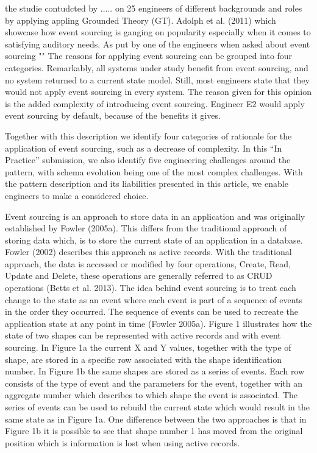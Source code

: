 the studie contudcted by ..... on 25 engineers of different backgrounds and roles by applying appling Grounded Theory (GT). Adolph et al. (2011) which showcase how event sourcing is ganging on popularity especially when it comes to satisfying auditory needs. As put by one of the engineers when asked about event sourcing ""
The reasons for applying event sourcing can be grouped into four categories. Remarkably, all systems under study benefit from event sourcing, and no system returned to a current state model. Still, most engineers state that they would not apply event sourcing in every system. The reason given for this opinion is the added complexity of introducing event sourcing. Engineer E2 would apply event sourcing by default, because of the benefits it gives.~\citep{OVEREEM2021110970}


Together with this description we identify four categories of rationale for the application of event sourcing, such as a decrease of complexity. In this “In Practice” submission, we also identify five engineering challenges around the pattern, with schema evolution being one of the most complex challenges. With the pattern description and its liabilities presented in this article, we enable engineers to make a considered choice.


Event sourcing is an approach to store data in an application and was originally established by
Fowler (2005a). This differs from the traditional approach of storing data which, is to store the
current state of an application in a database. Fowler (2002) describes this approach as active
records. With the traditional approach, the data is accessed or modified by four operations,
Create, Read, Update and Delete, these operations are generally referred to as CRUD operations
(Betts et al. 2013). The idea behind event sourcing is to treat each change to the state as an
event where each event is part of a sequence of events in the order they occurred. The sequence
of events can be used to recreate the application state at any point in time (Fowler 2005a).
Figure 1 illustrates how the state of two shapes can be represented with active records and with
event sourcing. In Figure 1a the current X and Y values, together with the type of shape, are
stored in a specific row associated with the shape identification number. In Figure 1b the same
shapes are stored as a series of events. Each row consists of the type of event and the parameters
for the event, together with an aggregate number which describes to which shape the event is
associated. The series of events can be used to rebuild the current state which would result in
the same state as in Figure 1a. One difference between the two approaches is that in Figure 1b it
is possible to see that shape number 1 has moved from the original position which is information
is lost when using active records.

